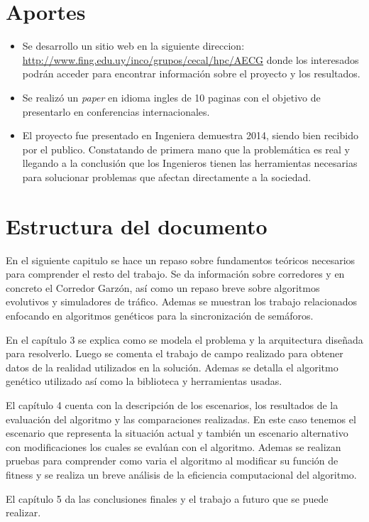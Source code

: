 \section{Aportes}

\begin{itemize}
	\item Se desarrollo un sitio web en la siguiente direccion: \url{http://www.fing.edu.uy/inco/grupos/cecal/hpc/AECG} donde los interesados podrán acceder para encontrar información sobre el proyecto y los resultados. 
	\item Se realizó un \emph{paper} en idioma ingles de 10 paginas con el objetivo de presentarlo en conferencias internacionales.
	\item El proyecto fue presentado en Ingeniera demuestra 2014, siendo bien recibido por el publico. Constatando de primera mano que la problemática es real y llegando a la conclusión que los Ingenieros tienen las herramientas necesarias para solucionar problemas que afectan directamente a la sociedad.

\end{itemize}






\section{Estructura del documento}
En el siguiente capitulo se hace un repaso sobre fundamentos teóricos necesarios para comprender el resto del trabajo. Se da información sobre corredores y en concreto el Corredor Garzón, así como un repaso breve sobre algoritmos evolutivos y simuladores de tráfico. Ademas se muestran los trabajo relacionados enfocando en algoritmos genéticos para la sincronización de semáforos.

En el capítulo 3 se explica como se modela el problema y la arquitectura diseñada  para resolverlo. Luego se comenta el trabajo de campo realizado para obtener datos de la realidad utilizados en la solución. Ademas se detalla el algoritmo genético utilizado así como la biblioteca y herramientas usadas.

El capítulo 4 cuenta con la descripción de los escenarios, los resultados de la evaluación del algoritmo y las comparaciones realizadas. En este caso tenemos el escenario que representa la situación actual y también un escenario alternativo con modificaciones los cuales se evalúan con el algoritmo. Ademas se realizan pruebas para comprender como varia el algoritmo al modificar su función de fitness y se realiza un breve análisis de la eficiencia computacional del algoritmo.

El capítulo 5 da las conclusiones finales y el trabajo a futuro que se puede realizar.






